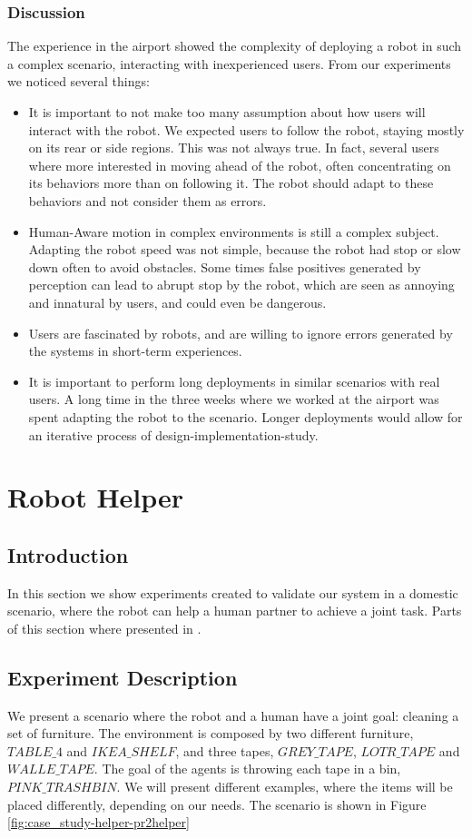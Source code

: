 \subsubsection{Discussion}
The experience in the airport showed the complexity of deploying a robot in such a complex scenario, interacting with inexperienced users. From our experiments we noticed several things:
\begin{itemize}
\item It is important to not make too many assumption about how users will interact with the robot. We expected users to follow the robot, staying mostly on its rear or side regions. This was not always true. In fact, several users where more interested in moving ahead of the robot, often concentrating on its behaviors more than on following it. The robot should adapt to these behaviors and not consider them as errors.
\item Human-Aware motion in complex environments is still a complex subject. Adapting the robot speed was not simple, because the robot had stop or slow down often to avoid obstacles. Some times false positives generated by perception can lead to abrupt stop by the robot, which are seen as annoying and innatural by users, and could even be dangerous.
\item Users are fascinated by robots, and are willing to ignore errors generated by the systems in short-term experiences.
\item It is important to perform long deployments in similar scenarios with real users. A long time in the three weeks where we worked at the airport was spent adapting the robot to the scenario. Longer deployments would allow for an iterative process of design-implementation-study.
\end{itemize}


\section{Robot Helper}
\subsection{Introduction}
In this section we show experiments created to validate our system in a domestic scenario, where the robot can help a human partner to achieve a joint task. Parts of this section where presented in \cite{fioreiser2014}.

\subsection{Experiment Description}
We present a scenario where the robot and a human have a joint goal: cleaning a set of furniture. 
The environment is composed by two different furniture, $TABLE\_4$ and $IKEA\_SHELF$, and three tapes,
 $GREY\_TAPE$, $LOTR\_TAPE$ and $WALLE\_TAPE$. The goal of the agents is throwing each tape in a bin,
 $PINK\_TRASHBIN$. We will present different examples, where the items will be placed differently, depending on our needs. The scenario is shown in Figure \ref{fig:case_study-helper-pr2helper}

